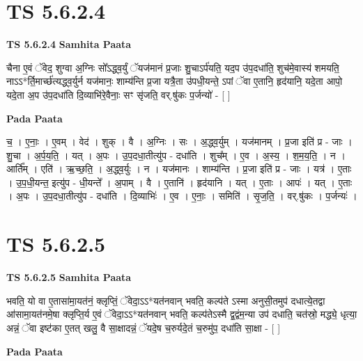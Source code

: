 \documentclass[17pt]{extarticle}
\begin{document}
\section{ TS 5.6.2.4 }

\textbf{TS 5.6.2.4 } \newline
\textbf{Samhita Paata} \newline

चैना ए॒वं ॅवेद॒ शुग्वा अ॒ग्निः सो᳚ऽद्ध्व॒र्युं ॅयज॑मानं प्र॒जाः शु॒चाऽर्प॑यति॒ यद॒प उ॑प॒दधा॑ति॒ शुच॑मे॒वास्य॑ शमयति॒ नाऽऽ*र्ति॒मार्च्छ॑त्यद्ध्व॒र्युर्न यज॑मानः॒ शाम्य॑न्ति प्र॒जा यत्रै॒ता उ॑पधी॒यन्ते॒ ऽपां ॅवा ए॒तानि॒ हृद॑यानि॒ यदे॒ता आपो॒ यदे॒ता अ॒प उ॑प॒दधा॑ति दि॒व्याभि॑रे॒वैनाः॒ सꣳ सृ॑जति॒ वर्.षु॑कः प॒र्जन्यो॑ - [  ] \newline

\textbf{Pada Paata} \newline

च॒ । ए॒नाः॒ । ए॒वम् । वेद॑ । शुक् । वै । अ॒ग्निः । सः । अ॒द्ध्व॒र्युम् । यज॑मानम् । प्र॒जा इति॑ प्र - जाः । शु॒चा । अ॒र्प॒य॒ति॒ । यत् । अ॒पः । उ॒प॒दधा॒तीत्यु॑प - दधा॑ति । शुच᳚म् । ए॒व । अ॒स्य॒ । श॒म॒य॒ति॒ । न । आर्ति᳚म् । एति॑ । ऋ॒च्छ॒ति॒ । अ॒द्ध्व॒र्युः । न । यज॑मानः । शाम्य॑न्ति । प्र॒जा इति॑ प्र - जाः । यत्र॑ । ए॒ताः । उ॒प॒धी॒यन्त॒ इत्यु॑प - धी॒यन्ते᳚ । अ॒पाम् । वै । ए॒तानि॑ । हृद॑यानि । यत् । ए॒ताः । आपः॑ । यत् । ए॒ताः । अ॒पः । उ॒प॒दधा॒तीत्यु॑प - दधा॑ति । दि॒व्याभिः॑ । ए॒व । ए॒नाः॒ । समिति॑ । सृ॒ज॒ति॒ । वर्.षु॑कः । प॒र्जन्यः॑ ।  \newline





\section{ TS 5.6.2.5 }

\textbf{TS 5.6.2.5 } \newline
\textbf{Samhita Paata} \newline

भवति॒ यो वा ए॒तासा॑मा॒यत॑नं॒ क्लृप्तिं॒ ॅवेदा॒ऽऽ*यत॑नवान् भवति॒ कल्प॑ते ऽस्मा अनुसी॒तमुप॑ दधात्ये॒तद्वा आ॑सामा॒यत॑नमे॒षा क्लृप्ति॒र्य ए॒वं ॅवेदा॒ऽऽ*यत॑नवान् भवति॒ कल्प॑तेऽस्मै द्व॒द्वंम॒न्या उप॑ दधाति॒ चत॑स्रो॒ मद्ध्ये॒ धृत्या॒ अन्नं॒ ॅवा इष्ट॑का ए॒तत् खलु॒ वै सा॒क्षादन्नं॒ ॅयदे॒ष च॒रुर्यदे॒तं च॒रुमु॑प॒ दधा॑ति सा॒क्षा - [  ] \newline

\textbf{Pada Paata} \newline
\end{document}
